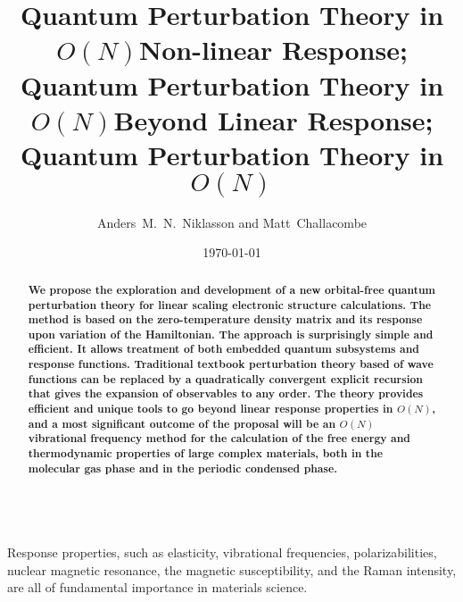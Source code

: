 
\draft
\tighten



\title{Quantum Perturbation Theory in $O(N)$}
\title{Non-linear Response; Quantum Perturbation Theory in $O(N)$}
\title{Beyond Linear Response; Quantum Perturbation Theory in $O(N)$}

\author{Anders~M.~N.~Niklasson and Matt~Challacombe}

\address{Theoretical Division, Los Alamos National Laboratory,
Los Alamos, NM 87545, USA}

\date{\today}
\maketitle

\begin{abstract}
{\small \bf We propose the exploration and development of
a new orbital-free quantum perturbation theory for linear 
scaling electronic structure calculations.  The method is 
based on the zero-temperature density matrix and its response 
upon variation of the Hamiltonian. The approach is surprisingly 
simple and efficient. It allows treatment of both embedded 
quantum subsystems and response functions. Traditional
textbook perturbation theory based of wave functions can be 
replaced by a quadratically convergent explicit recursion
that gives the expansion of observables to any order.
The theory provides efficient and unique tools to go 
beyond linear response properties in $O(N)$, and a most
significant outcome of the proposal will be an $O(N)$
vibrational frequency method for the calculation of
the free energy and thermodynamic properties of large
complex materials, both in the molecular gas phase and 
in the periodic condensed phase.}
\end{abstract}~ \\

Response properties, such as elasticity, vibrational frequencies, 
polarizabilities, nuclear magnetic resonance, the magnetic susceptibility, 
and the Raman intensity, are all of fundamental importance in 
materials science.

